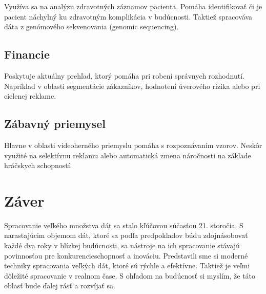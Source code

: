 \documentclass[10pt,slovak,a4paper]{article}
\begin{document}
Využíva sa na analýzu zdravotných záznamov pacienta. Pomáha identifikovať či je pacient náchylný ku zdravotným komplikácia v budúcnosti. Taktiež spracováva dáta z genómového sekvenovania (genomic sequencing).

\subsection {Financie} \label {Fin}

Poskytuje aktuálny prehľad, ktorý pomáha pri robení správnych rozhodnutí. Napríklad v oblasti segmentácie zákazníkov, hodnotení úverového rizika alebo pri cielenej reklame.

\subsection {Zábavný priemysel} \label {Zabav}

Hlavne v oblasti videoherného priemyslu pomáha s rozpoznávaním vzorov. Neskôr využité na selektívnu reklamu alebo automatická zmena náročnosti na základe hráčskych schopností.

\cite {ApacheAplication}

\section{Záver} \label{zaver} %
Spracovanie veľkého množstva dát sa stalo kľúčovou súčasťou 21. storočia. S narastajúcim objemom dát, ktoré sa podľa predpokladov búdu zdojnásobovať každé dva roky v blízkej budúcnosti\cite{Survey}, sa nástroje na ich spracovanie stávajú povinnosťou pre konkurencieschopnosť a inováciu. Predstavili sme si moderné techniky spracovania veľkých dát, ktoré sú rýchle a efektívne. Taktiež je veľmi dôležité spracovanie v realnom čase. S ohľadom na budúcnosť si myslím, že táto oblasť bude ďalej rásť a rozvíjať sa.





\end{document}
